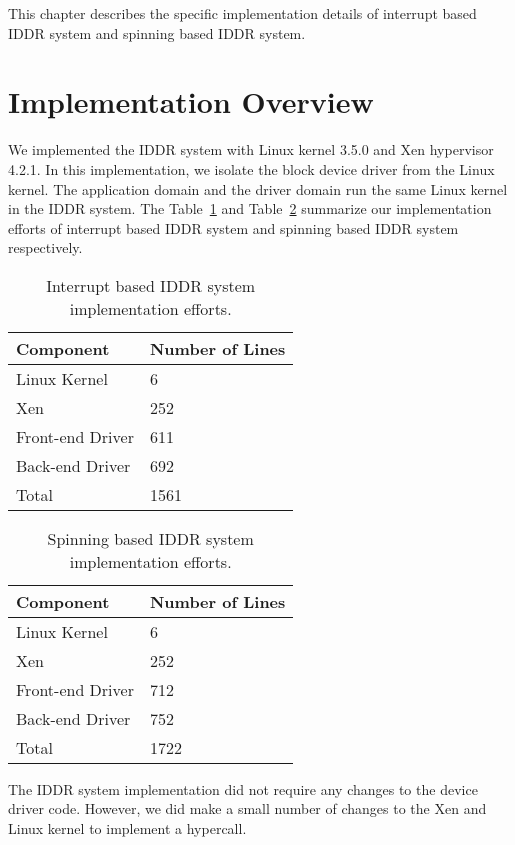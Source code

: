 This chapter describes the specific implementation details of interrupt based IDDR system and spinning based IDDR system.

\section{Implementation Overview} 
We implemented the IDDR system with Linux kernel 3.5.0 and Xen hypervisor 4.2.1. In this implementation, we isolate the block device driver from the Linux kernel. The application domain and the driver domain run the same Linux kernel in the IDDR system. The Table~\ref{tab:base} and Table~\ref{tab:new} summarize our implementation efforts of interrupt based IDDR system and spinning based IDDR system respectively.

\begin{table}
\caption{Interrupt based IDDR system implementation efforts.}
\begin{center}
\begin{tabular}{ll}
  \hline
  \label{tab:base}
  Component & Number of Lines \\
  \hline
  Linux Kernel & 6 \\
  Xen & 252 \\
  Front-end Driver & 611 \\
  Back-end Driver & 692 \\
  \hline 
  Total & 1561\\
  \hline
\end{tabular}
\end{center}
\end{table}

\begin{table}
\caption{Spinning based IDDR system implementation efforts.}
\begin{center}
\begin{tabular}{ll}
  \hline
  \label{tab:new}
  Component & Number of Lines \\
  \hline
  Linux Kernel & 6 \\
  Xen & 252 \\
  Front-end Driver & 712 \\
  Back-end Driver & 752 \\
  \hline 
  Total & 1722\\
  \hline
\end{tabular}
\end{center}
\end{table}

The IDDR system implementation did not require any changes to the device driver code. However, we did make a small number of changes to the Xen and Linux kernel to implement a hypercall.

